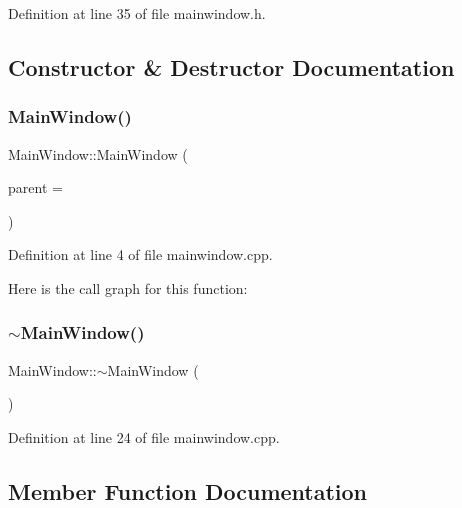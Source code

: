 Definition at line 35 of file mainwindow.\+h.



\subsection{Constructor \& Destructor Documentation}
\mbox{\label{class_main_window_a8b244be8b7b7db1b08de2a2acb9409db}} 
\subsubsection{\texorpdfstring{Main\+Window()}{MainWindow()}}
{\footnotesize\ttfamily Main\+Window\+::\+Main\+Window (\begin{DoxyParamCaption}\item[{Q\+Widget $\ast$}]{parent = {} }\end{DoxyParamCaption})\hspace{0.3cm}{\ttfamily [explicit]}}



Definition at line 4 of file mainwindow.\+cpp.

Here is the call graph for this function\+:
\mbox{\label{class_main_window_ae98d00a93bc118200eeef9f9bba1dba7}} 
\subsubsection{\texorpdfstring{$\sim$\+Main\+Window()}{~MainWindow()}}
{\footnotesize\ttfamily Main\+Window\+::$\sim$\+Main\+Window (\begin{DoxyParamCaption}{ }\end{DoxyParamCaption})}



Definition at line 24 of file mainwindow.\+cpp.



\subsection{Member Function Documentation}
\mbox{\label{class_main_window_aa0916a59a9d7ee37159ed0a2e0528960}} 
